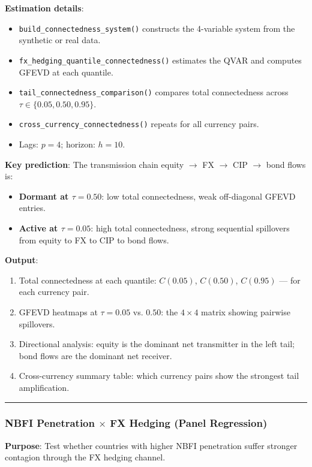 \documentclass[11pt,a4paper]{article}
\begin{document}
\textbf{Estimation details}:
\begin{itemize}
\item \texttt{build\_connectedness\_system()} constructs the 4-variable system from the synthetic or real data.
\item \texttt{fx\_hedging\_quantile\_connectedness()} estimates the QVAR and computes GFEVD at each quantile.
\item \texttt{tail\_connectedness\_comparison()} compares total connectedness across $\tau \in \{0.05, 0.50, 0.95\}$.
\item \texttt{cross\_currency\_connectedness()} repeats for all currency pairs.
\item Lags: $p = 4$; horizon: $h = 10$.

\end{itemize}
\textbf{Key prediction}: The transmission chain equity $\rightarrow$ FX $\rightarrow$ CIP $\rightarrow$ bond flows is:
\begin{itemize}
\item \textbf{Dormant at $\tau = 0.50$}: low total connectedness, weak off-diagonal GFEVD entries.
\item \textbf{Active at $\tau = 0.05$}: high total connectedness, strong sequential spillovers from equity to FX to CIP to bond flows.

\end{itemize}
\textbf{Output}:
\begin{enumerate}
\item Total connectedness at each quantile: $C(0.05)$, $C(0.50)$, $C(0.95)$ --- for each currency pair.
\item GFEVD heatmaps at $\tau = 0.05$ vs. $0.50$: the $4 \times 4$ matrix showing pairwise spillovers.
\item Directional analysis: equity is the dominant net transmitter in the left tail; bond flows are the dominant net receiver.
\item Cross-currency summary table: which currency pairs show the strongest tail amplification.

\end{enumerate}

\bigskip\noindent\rule{\textwidth}{0.4pt}\bigskip


\subsubsection{NBFI Penetration $\times$ FX Hedging (Panel Regression)}

\textbf{Purpose}: Test whether countries with higher NBFI penetration suffer stronger contagion through the FX hedging channel.
\end{document}
